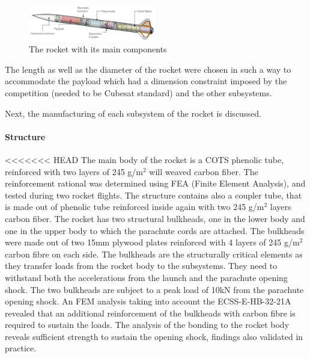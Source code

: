 \begin{figure}[h!]
\centering
\includegraphics[width=0.5\textwidth]{img/rocket_sw_annotated.jpg}
\caption{The rocket with its main components}
\label{f:rocket_adnoted}
\end{figure}


The length as well as the diameter of the rocket were chosen in such a way to accommodate the payload which had a dimension constraint imposed by the competition (needed to be Cubesat standard) and the other subsystems.

Next, the manufacturing of each subsystem of the rocket is discussed.




\paragraph{Structure}
\hfill \break
<<<<<<< HEAD
The main body of the rocket is a COTS phenolic tube, reinforced with two layers of 245 g/m$^2$ will weaved carbon fiber. The reinforcement rational was determined using FEA (Finite Element Analysis), and tested during two rocket flights.
The structure contains also a coupler tube, that is made out of phenolic tube reinforced inside again with two 245 g/m$^2$ layers carbon fiber.
The rocket has two structural bulkheads, one in the lower body and one in the upper body to which the parachute cords are attached. The bulkheads were made out of two 15mm plywood plates reinforced with 4 layers of 245 g/m$^2$ carbon fibre on each side.  The bulkheads are the structurally critical elements as they transfer loads from the rocket body to the subsystems. They need to withstand both the accelerations from the launch and the parachute opening shock. 
The two bulkheads are subject to a peak load of 10kN from the parachute opening shock. An FEM analysis taking into account the  ECSS-E-HB-32-21A revealed that an additional reinforcement of the bulkheads with carbon fibre is required to sustain the loads. The analysis of the bonding to the rocket body reveals sufficient strength to sustain the opening shock, findings also validated in practice.


